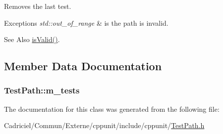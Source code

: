 Removes the last test. 
\begin{DoxyExceptions}{Exceptions}
{\em std\-::out\-\_\-of\-\_\-range} & is the path is invalid. \\
\hline
\end{DoxyExceptions}


\begin{DoxySeeAlso}{See Also}
\hyperlink{class_test_path_aca6ad4784df09af24573890d2d145435}{is\-Valid()}. 
\end{DoxySeeAlso}


\subsection{Member Data Documentation}
\hypertarget{class_test_path_aeda882fdb18011525ab63a6543648090}{
\subsubsection[{m\-\_\-tests}]{ Test\-Path\-::m\-\_\-tests\hspace{0.3cm}{\ttfamily [protected]}}}\label{class_test_path_aeda882fdb18011525ab63a6543648090}


The documentation for this class was generated from the following file\-:\begin{DoxyCompactItemize}
\item 
Cadriciel/\-Commun/\-Externe/cppunit/include/cppunit/\hyperlink{_test_path_8h}{Test\-Path.\-h}\end{DoxyCompactItemize}
